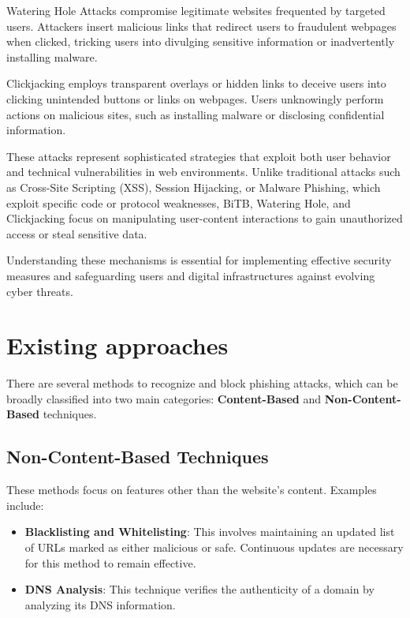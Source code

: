 Watering Hole Attacks compromise legitimate websites frequented by targeted users. Attackers insert malicious links that redirect users to fraudulent webpages when clicked, tricking users into divulging sensitive information or inadvertently installing malware.

Clickjacking employs transparent overlays or hidden links to deceive users into clicking unintended buttons or links on webpages. Users unknowingly perform actions on malicious sites, such as installing malware or disclosing confidential information.

These attacks represent sophisticated strategies that exploit both user behavior and technical vulnerabilities in web environments. Unlike traditional attacks such as Cross-Site Scripting (XSS), Session Hijacking, or Malware Phishing, which exploit specific code or protocol weaknesses, BiTB, Watering Hole, and Clickjacking focus on manipulating user-content interactions to gain unauthorized access or steal sensitive data.

Understanding these mechanisms is essential for implementing effective security measures and safeguarding users and digital infrastructures against evolving cyber threats.

\section{Existing approaches}
There are several methods to recognize and block phishing attacks, which can be broadly classified into two main categories: \textbf{Content-Based} and \textbf{Non-Content-Based} techniques.

\subsection*{Non-Content-Based Techniques}
These methods focus on features other than the website's content. Examples include:
\begin{itemize}
    \item \textbf{Blacklisting and Whitelisting}: This involves maintaining an updated list of URLs marked as either malicious or safe. Continuous updates are necessary for this method to remain effective.
    \item \textbf{DNS Analysis}: This technique verifies the authenticity of a domain by analyzing its DNS information.
\end{itemize}

